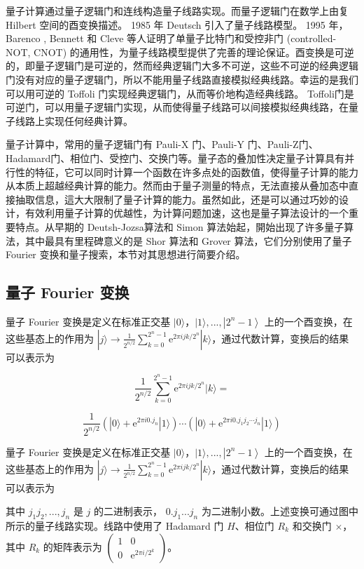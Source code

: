 量子计算通过量子逻辑门和连线构造量子线路实现。而量子逻辑门在数学上由复 Hilbert 空间的酉变换描述。 1985 年 Deutsch 引入了量子线路模型。 1995 年， Barenco , Bennett 和 Cleve 等人证明了单量子比特门和受控非门 (controlled-NOT, CNOT) 的通用性，为量子线路模型提供了完善的理论保证。酉变换是可逆的，即量子逻辑门是可逆的，然而经典逻辑门大多不可逆，这些不可逆的经典逻辑门没有对应的量子逻辑门，所以不能用量子线路直接模拟经典线路。幸运的是我们可以用可逆的 Toffoli 门实现经典逻辑门，从而等价地构造经典线路。 Toffoli门是可逆门，可以用量子逻辑门实现，从而使得量子线路可以间接模拟经典线路，在量子线路上实现任何经典计算。

量子计算中，常用的量子逻辑门有 Pauli-X 门、Pauli-Y 门、Pauli-Z门、Hadamard门、相位门、受控门、交换门等。量子态的叠加性决定量子计算具有并行性的特征，它可以同时计算一个函数在许多点处的函数值，使得量子计算的能力从本质上超越经典计算的能力。然而由于量子测量的特点，无法直接从叠加态中直接抽取信息，這大大限制了量子计算的能力。虽然如此，还是可以通过巧妙的设计，有效利用量子计算的优越性，为计算问题加速，这也是量子算法设计的一个重要特点。从早期的 Deutsh-Jozsa算法和 Simon 算法始起，開始出现了许多量子算法，其中最具有里程碑意义的是 Shor 算法和 Grover 算法，它们分别使用了量子 Fourier 变换和量子搜索，本节对其思想进行简要介绍。

\subsection{量子 Fourier 变换}

量子 Fourier 变换是定义在标准正交基 $|0\rangle$，$|1\rangle, ..., \left|2^{n}-1\right\rangle$ 上的一个酉变换，在这些基态上的作用为 $|j\rangle \rightarrow \frac{1}{2^{n / 2}} \sum_{k=0}^{2^{n}-1} \mathrm{e}^{2 \pi i j k / 2^{n}}|k\rangle$，通过代数计算，变换后的结果可以表示为

$$\frac{1}{2^{n / 2}} \sum_{k=0}^{2^{n}-1} \mathrm{e}^{2 \pi i j k / 2^{n}}|k\rangle=$$

$$\frac{1}{2^{n / 2}}\left(|0\rangle+\mathrm{e}^{2 \pi i 0 . j_{n}}|1\rangle\right) \cdots\left(|0\rangle+\mathrm{e}^{2 \pi i 0 . j_{1} j_{2} \cdots j_{n}}|1\rangle\right)$$

量子 Fourier 变换是定义在标准正交基 $|0\rangle$，$|1\rangle, ..., \left|2^{n}-1\right\rangle$ 上的一个酉变换，在这些基态上的作用为 $|j\rangle \rightarrow \frac{1}{2^{n / 2}} \sum_{k=0}^{2^{n}-1} \mathrm{e}^{2 \pi i j k / 2^{n}}|k\rangle$，通过代数计算，变换后的结果可以表示为

其中 $j_{1}j_{2}, ..., j_{n}$ 是 $j$ 的二进制表示， $0.j_{1} ... j_{n}$ 为二进制小数。上述变换可通过图中所示的量子线路实现。线路中使用了 Hadamard 门 $H$、相位门 $R_{k}$ 和交换门 $\times$，其中 $R_{k}$ 的矩阵表示为 $\left(\begin{array}{cc}1 & 0 \\ 0 & \mathrm{e}^{2 \pi i / 2^{k}}\end{array}\right)$。

